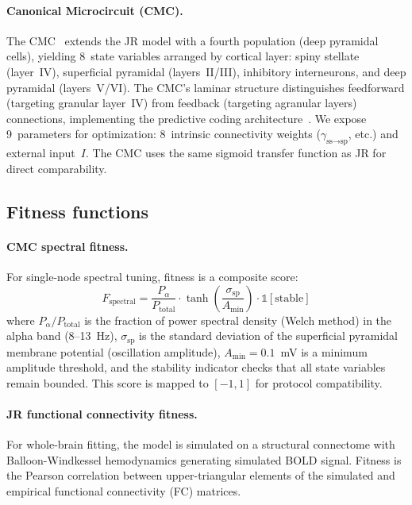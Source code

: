\documentclass[11pt,a4paper]{article}
\begin{document}
\paragraph{Canonical Microcircuit (CMC).}
The CMC~\citep{Bastos2012,Douglas2025} extends the JR model with a fourth population (deep pyramidal cells), yielding 8~state variables arranged by cortical layer: spiny stellate (layer~IV), superficial pyramidal (layers~II/III), inhibitory interneurons, and deep pyramidal (layers~V/VI).
The CMC's laminar structure distinguishes feedforward (targeting granular layer~IV) from feedback (targeting agranular layers) connections, implementing the predictive coding architecture~\citep{Bastos2012}.
We expose 9~parameters for optimization: 8~intrinsic connectivity weights ($\gamma_{\text{ss}\to\text{sp}}$, etc.) and external input~$I$.
The CMC uses the same sigmoid transfer function as JR for direct comparability.

\subsection{Fitness functions}

\paragraph{CMC spectral fitness.}
For single-node spectral tuning, fitness is a composite score:
\begin{equation}
    F_\text{spectral} = \frac{P_\alpha}{P_\text{total}} \cdot \tanh\!\left(\frac{\sigma_\text{sp}}{A_\text{min}}\right) \cdot \mathbb{1}[\text{stable}]
\end{equation}
where $P_\alpha / P_\text{total}$ is the fraction of power spectral density (Welch method) in the alpha band (8--13~Hz), $\sigma_\text{sp}$ is the standard deviation of the superficial pyramidal membrane potential (oscillation amplitude), $A_\text{min} = 0.1$~mV is a minimum amplitude threshold, and the stability indicator checks that all state variables remain bounded.
This score is mapped to $[-1, 1]$ for protocol compatibility.

\paragraph{JR functional connectivity fitness.}
For whole-brain fitting, the model is simulated on a structural connectome with Balloon-Windkessel hemodynamics generating simulated BOLD signal.
Fitness is the Pearson correlation between upper-triangular elements of the simulated and empirical functional connectivity (FC) matrices.
\end{document}
